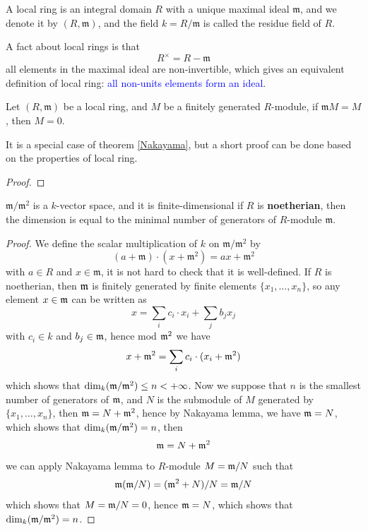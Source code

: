 \begin{definition}
    A local ring is an integral domain \(R\) with a unique maximal ideal \(\mathfrak{m}\), and we denote it by \((R,\mathfrak{m})\), and the field \(k = R/\mathfrak{m}\) is called the residue field of \(R\).
\end{definition}

A fact about local rings is that 
\[R^\times = R - \mathfrak{m}\]
all elements in the maximal ideal are non-invertible, which gives an equivalent definition of local ring: \textcolor{blue}{all non-units elements form an ideal}.

\begin{lemma}[Nakayama]\label{Nakayama}
    Let \((R,\mathfrak{m})\) be a local ring, and \(M\) be a finitely generated \(R\)-module, if \(\mathfrak{m}M = M\), then \(M = 0\).
\end{lemma}

It is a special case of theorem \ref{Nakayama}, but a short proof can be done based on the properties of local ring.

\begin{proof}

\end{proof}


\begin{corollary}
    \(\mathfrak{m}/\mathfrak{m}^2\) is a \(k\)-vector space, and it is finite-dimensional if \(R\) is \textbf{noetherian}, then the dimension is equal to the minimal number of generators of \(R\)-module  \(\mathfrak{m}\).
\end{corollary}

\begin{proof}
    We define the scalar multiplication of \(k\) on \(\mathfrak{m}/\mathfrak{m}^2\) by
    \[(a+ \mathfrak{m}) \cdot (x + \mathfrak{m}^2) = ax + \mathfrak{m}^2\]
    with \(a \in R\) and \(x \in \mathfrak{m}\), it is not hard to check that it is well-defined. If \(R\) is noetherian, then \(\mathfrak{m}\) is finitely generated by finite elements \(\{x_1,\dots,x_n\}\), so any element \(x \in \mathfrak{m}\) can be written as
    \[x = \sum_i c_i \cdot x_i + \sum_j b_j x_j\]
    with \(c_i \in k\) and \(b_j \in \mathfrak{m}\), hence mod \(\mathfrak{m}^2\) we have
    \[x + \mathfrak{m}^2 = \sum_i c_i \cdot (x_i + \mathfrak{m}^2)\]
    which shows that \(\dim_k(\mathfrak{m}/\mathfrak{m}^2) \leq n < +\infty\). Now we suppose that \(n\) is the smallest number of generators of \(\mathfrak{m}\), and \(N\) is the submodule of \(M\) generated by \(\{x_1,\dots,x_n\}\), then \(\mathfrak{m} = N + \mathfrak{m}^2\), hence by Nakayama lemma, we have \(\mathfrak{m} = N\), which shows that \(\dim_k(\mathfrak{m}/\mathfrak{m}^2) = n\), then 
    \[\mathfrak{m} = N + \mathfrak{m}^2\]
    we can apply Nakayama lemma to \(R\)-module \(M = \mathfrak{m}/N\) such that
    \[\mathfrak{m}(\mathfrak{m}/N) = (\mathfrak{m}^2+N)/N = \mathfrak{m}/N\]
    which shows that \(M = \mathfrak{m}/N = 0\), hence \(\mathfrak{m} = N\), which shows that \(\dim_k(\mathfrak{m}/\mathfrak{m}^2) = n\).
\end{proof}

